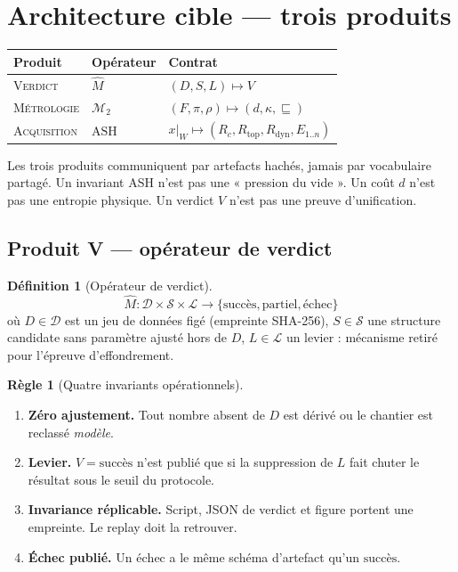 \documentclass[11pt,a4paper]{article}
\newcommand{\Mhat}{\hat{M}}
\newcommand{\Mtwo}{\mathcal{M}_{2}}
\theoremstyle{definition}
\newtheorem{definition}{Définition}
\newtheorem{regle}{Règle}
\begin{document}
\section{Architecture cible --- trois produits}

\begin{center}
\renewcommand{\arraystretch}{1.15}
\begin{tabular}{@{}llp{72mm}@{}}
\toprule
\textbf{Produit} & \textbf{Opérateur} & \textbf{Contrat} \\
\midrule
\textsc{Verdict} & \(\Mhat\) & \((D,S,L)\mapsto V\) \\
\textsc{Métrologie} & \(\Mtwo\) & \((F,\pi,\rho)\mapsto(d,\kappa,\sqsubseteq)\) \\
\textsc{Acquisition} & \(\mathrm{ASH}\) & \(x|_{W}\mapsto (R_c,R_{\mathrm{top}},R_{\mathrm{dyn}},E_{1..n})\) \\
\bottomrule
\end{tabular}
\end{center}

Les trois produits communiquent par artefacts hachés, jamais par vocabulaire partagé. Un invariant ASH n'est pas une « pression du vide ». Un coût \(d\) n'est pas une entropie physique. Un verdict \(V\) n'est pas une preuve d'unification.

\subsection{Produit V --- opérateur de verdict}

\begin{definition}[Opérateur de verdict]
\[
\Mhat : \mathcal{D}\times\mathcal{S}\times\mathcal{L}\longrightarrow
\{\mathrm{succès},\mathrm{partiel},\mathrm{échec}\}
\]
où \(D\in\mathcal{D}\) est un jeu de données figé (empreinte SHA-256), \(S\in\mathcal{S}\) une structure candidate sans paramètre ajusté hors de \(D\), \(L\in\mathcal{L}\) un levier : mécanisme retiré pour l'épreuve d'effondrement.
\end{definition}

\begin{regle}[Quatre invariants opérationnels]
\begin{enumerate}
  \item \textbf{Zéro ajustement.} Tout nombre absent de \(D\) est dérivé ou le chantier est reclassé \emph{modèle}.
  \item \textbf{Levier.} \(V=\mathrm{succès}\) n'est publié que si la suppression de \(L\) fait chuter le résultat sous le seuil du protocole.
  \item \textbf{Invariance réplicable.} Script, JSON de verdict et figure portent une empreinte. Le replay doit la retrouver.
  \item \textbf{Échec publié.} Un \(\mathrm{échec}\) a le même schéma d'artefact qu'un \(\mathrm{succès}\).
\end{enumerate}
\end{regle}
\end{document}
